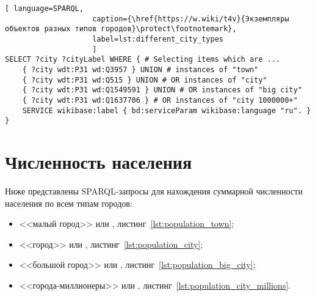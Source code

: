 \begin{lstlisting}[ language=SPARQL, 
                    caption={\href{https://w.wiki/t4v}{Экземпляры объектов разных типов городов}\protect\footnotemark},
                    label=lst:different_city_types
                    ]
SELECT ?city ?cityLabel WHERE { # Selecting items which are ...
	{ ?city wdt:P31 wd:Q3957 } UNION # instances of "town"
	{ ?city wdt:P31 wd:Q515 } UNION # OR instances of "city"
	{ ?city wdt:P31 wd:Q1549591 } UNION # OR instances of "big city"
	{ ?city wdt:P31 wd:Q1637706 } # OR instances of "city 1000000+"                                
	SERVICE wikibase:label { bd:serviceParam wikibase:language "ru". }
}
\end{lstlisting}


\section{Численность населения}

Ниже представлены SPARQL-запросы для нахождения суммарной численности населения по всем типам городов: 
\begin{itemize}
	\item <<малый город>> или , листинг~\ref{lst:population_town};
	\item <<город>> или , листинг~\ref{lst:population_city};
	\item <<большой город>> или , листинг~\ref{lst:population_big_city};
	\item <<города-миллионеры>> или , листинг~\ref{lst:population_city_millions}.
\end{itemize}


